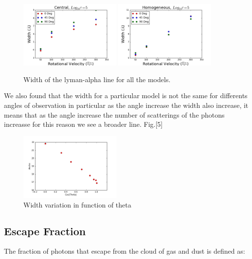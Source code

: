 \documentclass[usenatbib]{mn2e}
\begin{document}
\begin{figure}
    \includegraphics[width=0.45\textwidth]{Width5.png}
    \includegraphics[width=0.45\textwidth]{Width5HOM.png}
  \label{figure:width}\caption{Width of the lyman-alpha line for all the models. }
\end{figure}

We also found that the width for a particular model is not the same
for differents angles of observation in particular as the angle
increase the width also increase, it means that as the angle increase
the number of scatterings of the photons increasse for this reason we
see a broader line. Fig.[5]\\ 

\begin{figure}
\begin{center}
\includegraphics[width=0.45\textwidth]{WidthvsTheta.png}
\caption{Width variation in function of theta}
\end{center}
\end{figure}




\subsection{Escape Fraction}
\label{sec:EF}

The fraction of photons that escape from the cloud of gas and dust is
defined as:\\ 
\end{document}
